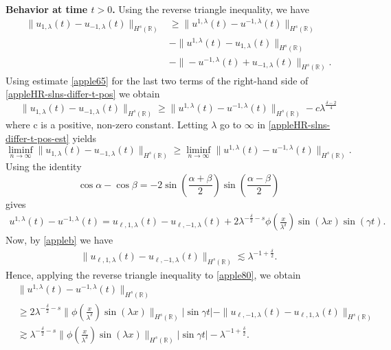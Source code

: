 \documentclass[12pt,reqno]{amsart}
\newcommand{\rr}{\mathbb{R}}
\theoremstyle{plain}  %
\theoremstyle{definition}
\begin{document}
{\bf Behavior at time  $t>0$.}  Using the reverse triangle inequality, we 
have
%
%
%
%
%
\begin{equation} \label{appleHR-slns-differ-t-pos}
\begin{split}
\|
u_{1,\lambda}(t)
-
u_{- 1,\lambda}(t)
\|_{H^s(\rr)}
&
\ge
\|
u^{1,\lambda}(t)
-
u^{- 1,\lambda}(t)
\|_{H^s(\rr)}
\\
& -
\|
u^{1,\lambda}(t)
-
u_{1,\lambda}(t)
\|_{H^s(\rr)}
\\
& -
\|
-u^{-1,\lambda}(t)
+
u_{-1,\lambda}(t)
\|_{H^s(\rr)} .
\end{split}
\end{equation}
%
%
%
%
Using estimate \eqref{apple65} for the last two terms of 
the right-hand side of \eqref{appleHR-slns-differ-t-pos} we obtain
%
%
%
%
%
\begin{equation} \label{appleHR-slns-differ-t-pos-est}
\|
u_{1,\lambda}(t)
-
u_{- 1,\lambda}(t)
\|_{H^s(\rr)}
\ge
\|
u^{1,\lambda}(t)
-
u^{- 1,\lambda}(t)
\|_{H^s(\rr)}
-
c \lambda^{\frac{\delta - 2}{4}}
\end{equation}
%
%
where c is a positive, non-zero constant. Letting $\lambda$ go to $\infty$ 
in
\eqref{appleHR-slns-differ-t-pos-est}
yields
%
%
%
\begin{equation} \label{appleHR-slns-to-ap-est}
\liminf_{n\to\infty}
\|
u_{1,\lambda}(t)
-
u_{- 1,\lambda}(t)
\|_{H^s(\rr)}
\ge
\liminf_{n\to\infty}
\|
u^{1,\lambda}(t)
-
u^{- 1,\lambda}(t)
\|_{H^s(\rr)}.
\end{equation}
%
%
%
%
Using the identity $$
\cos \alpha -\cos \beta
=
-2
\sin(\frac{\alpha + \beta}{2})
\sin(\frac{\alpha - \beta}{2})
$$
gives
%
%
\begin{equation}
\label{apple80}
\begin{split}
u^{1,\lambda}(t)
-
u^{- 1,\lambda}(t)
=
u_{\ell,1,\lambda}(t) - u_{\ell,-1,\lambda}(t) + 
2\lambda^{-\frac{\delta}{2}-s}
\phi\left( \frac{x}{\lambda^\delta} \right)\sin(\lambda x) \sin(\gamma t).
\end{split}
\end{equation}
%
%
Now, by  \autoref{appleb} we have
%
%
\begin{equation*}
\begin{split}
\|u_{\ell,1,\lambda}(t) - u_{\ell,-1,\lambda}(t)\|_{H^s(\rr)} \lesssim
\lambda^{-1 + \frac{\delta}{2}}.
\end{split}
\end{equation*}
%
%
Hence, applying the reverse triangle inequality to \eqref{apple80}, we 
obtain
%
%
\begin{equation} \label{apple90}
\begin{split}
& \|
u^{1,\lambda}(t)
-
u^{- 1,\lambda}(t)
\|_{H^s(\rr)}
\\
& \ge 2 \lambda^{-\frac{\delta}{2}-s} \|\phi\left(
\frac{x}{\lambda^\delta} \right) \sin(\lambda x) \|_{H^s(\rr)} |\sin \gamma 
t|
- \|u_{\ell,-1,\lambda}(t) - u_{\ell,1,\lambda}(t)\|_{H^s(\rr)} \\
& \gtrsim \lambda^{-\frac{\delta}{2}-s} \|\phi\left(
\frac{x}{\lambda^\delta} \right ) \sin(\lambda x) \|_{H^s(\rr)} |\sin 
\gamma t| -
\lambda^{-1 + \frac{\delta}{2}}.
\end{split}
\end{equation}
\end{document}
